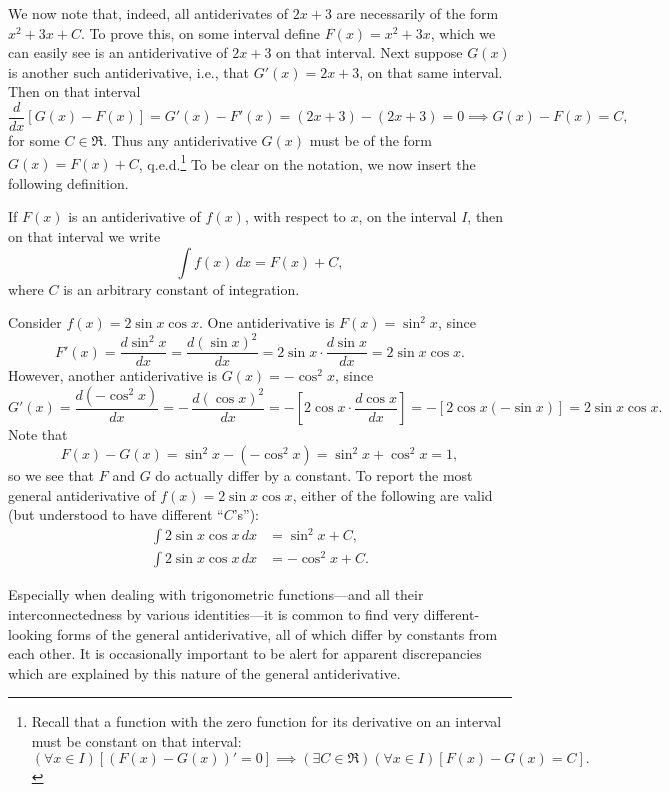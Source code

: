 We now note that, indeed, all antiderivates of $2x+3$
are necessarily of the form $x^2+3x+C$.  To prove this, on some interval
define $F(x)=x^2+3x$, which we can easily see is an antiderivative
of $2x+3$ on that interval.
Next suppose $G(x)$ is another such antiderivative,
i.e., that $G'(x)=2x+3$, on that same interval.  Then on that interval
$$\frac{d}{dx}\left[G(x)-F(x)\right]
=G'(x)-F'(x)=(2x+3)-(2x+3)=0
\implies G(x)-F(x)=C,$$
for some $C\in\Re$.  Thus any antiderivative $G(x)$
must be of the form $G(x)=F(x)+C$, q.e.d.\footnote{%
Recall that a function with the zero function for its derivative
on an interval
must be constant on that interval: 
$$(\forall x\in I)[(F(x)-G(x))'=0]\implies (\exists C\in\Re)
      (\forall x\in I)[F(x)-G(x)= C].$$}
To be clear on the notation, we now insert the following definition.
\begin{definition}
If $F(x)$ is an antiderivative of $f(x)$, with respect to $x$,
on the interval $I$, then on that interval we write
\begin{equation}
\int f(x)\,dx=F(x)+C,\label{DefIndefIntegral} 
\end{equation}
where $C$ is an arbitrary constant of integration.
\end{definition}
\bex Consider $f(x)=2\sin x\cos x$.  One antiderivative
is $F(x)=\sin^2x$, since
$$F'(x)=\frac{d\sin^2x}{dx}=\frac{d(\sin x)^2}{dx}
=2\sin x\cdot\frac{d\sin x}{dx}=2\sin x\cos x.$$
However, another antiderivative is $G(x)=-\cos^2x$, since
$$G'(x)=\frac{d(-\cos^2x)}{dx}
=-\,\frac{d(\cos x)^2}{dx}
=-\left[2\cos x\cdot\frac{d\cos x}{dx}\right]
=-\left[2\cos x(-\sin x)\right]=2\sin x\cos x.$$
Note that
$$F(x)-G(x)=\sin^2x-\left(-\cos^2x\right)=\sin^2x+\cos^2x=1,$$
so we see that $F$ and $G$ do actually differ by a constant.
To report the most general antiderivative of $f(x)=2\sin x\cos x$,
either of the following are valid (but understood to 
have different ``$C$'s''):
\begin{align*}
\int2\sin x\cos x\,dx&=\sin^2x+C,\\
\int2\sin x\cos x\,dx&=-\cos^2x+C.
\end{align*}
\eex

Especially when dealing with trigonometric functions---and
all their interconnectedness by various identities---it is 
common to find very different-looking forms
of the general antiderivative, all of which differ by
constants from each other. It is occasionally important to be 
alert for apparent discrepancies which are explained 
by this nature of the general antiderivative.

